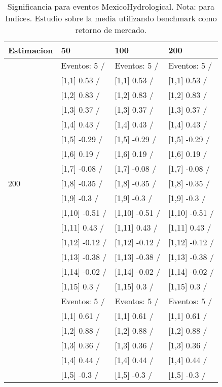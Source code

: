 \begin{table}

\caption{Significancia para eventos MexicoHydrological. Nota: para Indices. Estudio sobre la media utilizando benchmark como retorno de mercado.}
\centering
\begin{tabular}[t]{llll}
\toprule
Estimacion & 50 & 100 & 200\\
\midrule
 & Eventos:  5 / & Eventos:  5 / & Eventos:  5 /\\
 & {}[1,1] 0.53  / & {}[1,1] 0.53  / & {}[1,1] 0.53  /\\
 & {}[1,2] 0.83  / & {}[1,2] 0.83  / & {}[1,2] 0.83  /\\
 & {}[1,3] 0.37  / & {}[1,3] 0.37  / & {}[1,3] 0.37  /\\
 & {}[1,4] 0.43  / & {}[1,4] 0.43  / & {}[1,4] 0.43  /\\
\addlinespace
 & {}[1,5] -0.29  / & {}[1,5] -0.29  / & {}[1,5] -0.29  /\\
 & {}[1,6] 0.19  / & {}[1,6] 0.19  / & {}[1,6] 0.19  /\\
 & {}[1,7] -0.08  / & {}[1,7] -0.08  / & {}[1,7] -0.08  /\\
200 & {}[1,8] -0.35  / & {}[1,8] -0.35  / & {}[1,8] -0.35  /\\
 & {}[1,9] -0.3  / & {}[1,9] -0.3  / & {}[1,9] -0.3  /\\
\addlinespace
 & {}[1,10] -0.51  / & {}[1,10] -0.51  / & {}[1,10] -0.51  /\\
 & {}[1,11] 0.43  / & {}[1,11] 0.43  / & {}[1,11] 0.43  /\\
 & {}[1,12] -0.12  / & {}[1,12] -0.12  / & {}[1,12] -0.12  /\\
 & {}[1,13] -0.38  / & {}[1,13] -0.38  / & {}[1,13] -0.38  /\\
 & {}[1,14] -0.02  / & {}[1,14] -0.02  / & {}[1,14] -0.02  /\\
\addlinespace
 & {}[1,15] 0.3  / & {}[1,15] 0.3  / & {}[1,15] 0.3  /\\
 & Eventos:  5 / & Eventos:  5 / & Eventos:  5 /\\
 & {}[1,1] 0.61  / & {}[1,1] 0.61  / & {}[1,1] 0.61  /\\
 & {}[1,2] 0.88  / & {}[1,2] 0.88  / & {}[1,2] 0.88  /\\
 & {}[1,3] 0.36  / & {}[1,3] 0.36  / & {}[1,3] 0.36  /\\
\addlinespace
 & {}[1,4] 0.44  / & {}[1,4] 0.44  / & {}[1,4] 0.44  /\\
 & {}[1,5] -0.3  / & {}[1,5] -0.3  / & {}[1,5] -0.3  /\\

\end{tabular}
\end{table}
